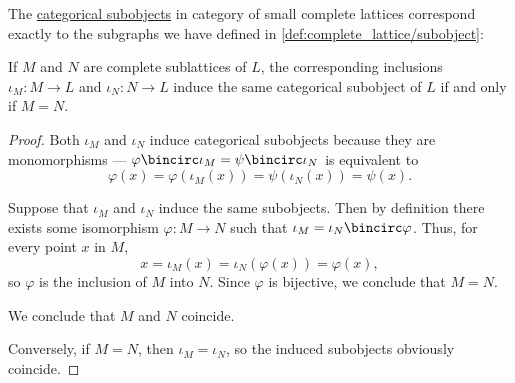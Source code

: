 \begin{proposition}\label{thm:complete_sublattice}
  The \hyperref[def:categorical_subobject]{categorical subobjects} in category of small complete lattices correspond exactly to the subgraphs we have defined in \cref{def:complete_lattice/subobject}:
  \begin{displayquote}
    If \( M \) and \( N \) are complete sublattices of \( L \), the corresponding inclusions \( \iota_M: M \to L \) and \( \iota_N: N \to L \) induce the same categorical subobject of \( L \) if and only if \( M = N \).
  \end{displayquote}
\end{proposition}
\begin{proof}
  Both \( \iota_M \) and \( \iota_N \) induce categorical subobjects because they are monomorphisms --- \( \varphi \bincirc \iota_M = \psi \bincirc \iota_N \) is equivalent to
  \begin{equation*}
    \varphi(x) = \varphi(\iota_M(x)) = \psi(\iota_N(x)) = \psi(x).
  \end{equation*}

  \SufficiencySubProof Suppose that \( \iota_M \) and \( \iota_N \) induce the same subobjects. Then by definition there exists some isomorphism \( \varphi: M \to N \) such that \( \iota_M = \iota_N \bincirc \varphi \). Thus, for every point \( x \) in \( M \),
  \begin{equation*}
    x = \iota_M(x) = \iota_N(\varphi(x)) = \varphi(x),
  \end{equation*}
  so \( \varphi \) is the inclusion of \( M \) into \( N \). Since \( \varphi \) is bijective, we conclude that \( M = N \).

  We conclude that \( M \) and \( N \) coincide.

  \NecessitySubProof Conversely, if \( M = N \), then \( \iota_M = \iota_N \), so the induced subobjects obviously coincide.
\end{proof}

